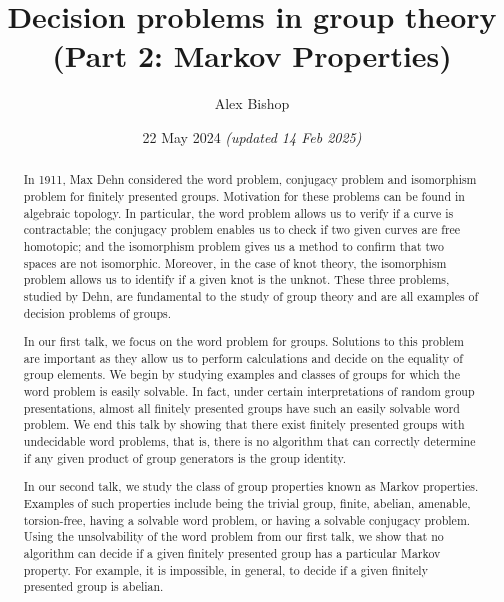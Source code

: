 \documentclass[11pt,a4paper,reqno]{amsart}
\theoremstyle{plain}
\theoremstyle{definition}
\theoremstyle{definition}
\begin{document}
\title{Decision problems in group theory\\(Part 2: Markov Properties)}
\author{Alex Bishop}
\date{22 May 2024 \textit{(updated 14 Feb 2025)}}
\address{%
	Section de mathématiques\\
	Université de Genève\\
	rue du Conseil-Général~7-9\\
	1205 Genève, Switzerland}

\begin{abstract}
	In 1911, Max Dehn considered the word problem, conjugacy problem and isomorphism problem for finitely presented groups. Motivation for these problems can be found in algebraic topology. In particular, the word problem allows us to verify if a curve is contractable; the conjugacy problem enables us to check if two given curves are free homotopic; and the isomorphism problem gives us a method to confirm that two spaces are not isomorphic. Moreover, in the case of knot theory, the isomorphism problem allows us to identify if a given knot is the unknot. These three problems, studied by Dehn, are fundamental to the study of group theory and are all examples of decision problems of groups.

	In our first talk, we focus on the word problem for groups. Solutions to this problem are important as they allow us to perform calculations and decide on the equality of group elements. We begin by studying examples and classes of groups for which the word problem is easily solvable. In fact, under certain interpretations of random group presentations, almost all finitely presented groups have such an easily solvable word problem. We end this talk by showing that there exist finitely presented groups with undecidable word problems, that is, there is no algorithm that can correctly determine if any given product of group generators is the group identity.

	In our second talk, we study the class of group properties known as Markov properties. Examples of such properties include being the trivial group, finite, abelian, amenable, torsion-free, having a solvable word problem, or having a solvable conjugacy problem. Using the unsolvability of the word problem from our first talk, we show that no algorithm can decide if a given finitely presented group has a particular Markov property. For example, it is impossible, in general, to decide if a given finitely presented group is abelian.
\end{abstract}
\maketitle
\end{document}
